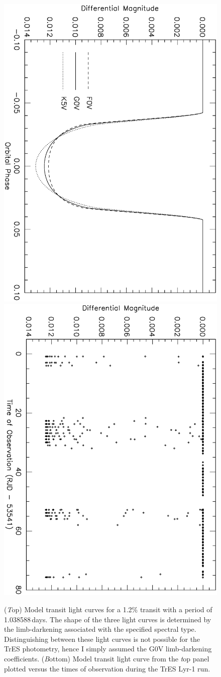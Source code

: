 \begin{figure}
\begin{center}
\centering
\includegraphics[width=.55\textwidth, angle=90]{7_agol_a}\\
\includegraphics[width=.55\textwidth, angle=90]{7_agol_b}\\
\caption[Example of model transits]{%
({\textit Top}) %
Model transit light curves for a 1.2\% transit with a period of 1.038588\,days.
The shape of the three light curves is determined by the limb-darkening associated with the specified spectral type.
Distinguishing between these light curves is not possible for the TrES photometry, hence I simply assumed the G0V limb-darkening coefficients.
({\textit Bottom}) Model transit light curve from the {\textit top panel} plotted versus the times of observation during the TrES Lyr-1 run. %
}\label{cha:human:sec:model:fig:agol}%
\end{center}
\end{figure}

